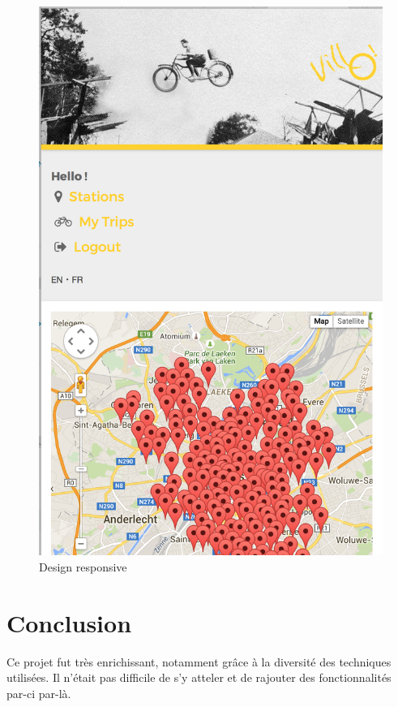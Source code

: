 \documentclass[a4paper]{article}
\begin{document}
    \begin{figure}
    \begin{center}
	\includegraphics[width=\textwidth/2]{s23.png}
    \end{center}
    \caption{Design responsive}
    \label{fig-s23}
	\end{figure}
   
\section{Conclusion}

Ce projet fut très enrichissant, notamment grâce à la diversité des techniques utilisées. Il n'était pas difficile de s'y atteler et de rajouter des fonctionnalités par-ci par-là.\\
\end{document}
